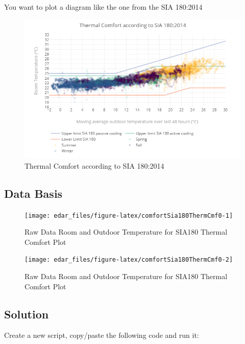 \documentclass[
  a4paperpaper,
]{book}
\begin{document}
You want to plot a diagram like the one from the SIA 180:2014

\begin{figure}
\includegraphics[width=0.7\linewidth]{images/comfortSia180ThermCmf} \caption{Thermal Comfort according to SIA 180:2014}\label{fig:unnamed-chunk-30}
\end{figure}

\hypertarget{data-basis-20}{%
\subsection{Data Basis}\label{data-basis-20}}

\begin{figure}
\texttt{[image: edar\_files/figure-latex/comfortSia180ThermCmf0-1]} \caption{Raw Data Room and Outdoor Temperature for SIA180 Thermal Comfort Plot}\label{fig:comfortSia180ThermCmf0-1}
\end{figure}
\begin{figure}
\texttt{[image: edar\_files/figure-latex/comfortSia180ThermCmf0-2]} \caption{Raw Data Room and Outdoor Temperature for SIA180 Thermal Comfort Plot}\label{fig:comfortSia180ThermCmf0-2}
\end{figure}

\newpage

\hypertarget{solution-20}{%
\subsection{Solution}\label{solution-20}}

Create a new script, copy/paste the following code and run it:
\end{document}

